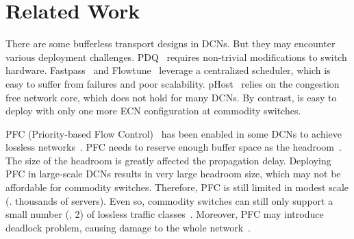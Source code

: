 \section{Related Work}\label{sec:related}
\vspace{-1mm}
There are some bufferless transport designs in DCNs. But they may encounter various deployment challenges. PDQ~\cite{pdq} requires non-trivial modifications to switch hardware. Fastpass~\cite{fastpass} and Flowtune~\cite{flowtune} leverage a centralized scheduler, which is easy to suffer from failures and poor scalability. pHost~\cite{phost} relies on the congestion free network core, which does not hold for many DCNs. By contrast, \sys is easy to deploy with only one more ECN configuration at commodity switches.

\vspace{-1mm}
PFC (Priority-based Flow Control)~\cite{pfc} has been enabled in some DCNs to achieve lossless networks~\cite{rdma_scale}. PFC needs to reserve enough buffer space as the headroom~\cite{rdma_scale}. The size of the headroom is greatly affected the propagation delay. Deploying PFC in large-scale DCNs results in very large headroom size, which may not be affordable for commodity switches. Therefore, PFC is still limited in modest scale (\eg. thousands of servers). Even so, commodity switches can still only support a small number (\eg, 2) of lossless traffic classes~\cite{rdma_scale}. Moreover, PFC may introduce deadlock problem, causing damage to the whole network~\cite{rdma_scale}. 